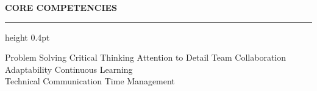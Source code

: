 \documentclass[10pt,letterpaper]{article}
\newcommand{\cvsection}[1]{%
  \vspace{7pt}%
  {\fontsize{12}{13}\selectfont\bfseries\MakeUppercase{#1}}\par
  \vspace{2pt}\hrule height 0.4pt\vspace{4pt}%
}
\begin{document}
\cvsection{Core Competencies}
Problem Solving \enspace\textbullet\enspace Critical Thinking \enspace\textbullet\enspace Attention to Detail
\enspace\textbullet\enspace Team Collaboration \enspace\textbullet\enspace Adaptability
\enspace\textbullet\enspace Continuous Learning\\
\textbullet\enspace Technical Communication \enspace\textbullet\enspace Time Management
\end{document}
